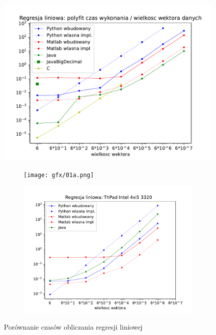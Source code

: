 \begin{figure}[h]
    	\centering 
            \includegraphics[width=0.70\linewidth]{gfx/fig01.pdf} 
\end{figure} 
\begin{figure}[h]
    \begin{subfigure}{.5\textwidth}
    	\centering 
            \texttt{[image: gfx/01a.png]} 
    \end{subfigure} %
    \begin{subfigure} {.5\textwidth}
    	\centering 
            \includegraphics[width=0.95\linewidth]{gfx/fig01_PC2.pdf} 
    \end{subfigure} 
    \caption{Porównanie czasów obliczania regresji liniowej}
\end{figure} 